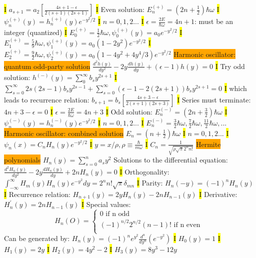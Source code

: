 \documentclass[fontsize=4pt]{scrartcl}
\begin{document}
\hl{I}
$a_{s+1} = a_2[\frac{4s+1-\epsilon}{2(s+1)(2s+1)}]$
\hl{I}
Even solution: $E_n^{(+)} = (2n+\frac{1}{2})\hbar \omega$
\hl{I}
$\psi_n^{(+)}(y) = h_{n}^{(+)}(y)e^{-y^2/2}$
\hl{I}
$n = 0,1,2 ...$
\hl{I}
$\epsilon =\frac{2E}{\hbar \omega}=4n+1$: must be an integer (quantized)
\hl{I}
$E_0^{(+)} = \frac{1}{2}\hbar \omega, \psi_0^{(+)}(y) = a_0 e^{-y^2 /2}$
\hl{I}
$E_1^{(+)} = \frac{5}{9}\hbar \omega, \psi_1^{(+)}(y) = a_0 (1-2y^2)e^{-y^2 /2}$
\hl{I}
$E_2^{(+)} = \frac{9}{2}\hbar \omega, \psi_2^{(+)}(y) = a_0(1-4y^2+4y^4/3) e^{-y^2 /2}$
\colorbox{Orange}{Harmonic oscillator: quantum odd-party solution}
$\frac{d^2 h(y)}{dy^2} -2y\frac{dh(y)}{dy} + (\epsilon - 1)h(y) = 0$
\hl{I}
Try odd solution: $h^{(-)}(y) = \sum_0^{\infty} b_s y^{2s+1}$
\hl{I}
$\sum_{s=0}^{\infty} 2s(2s - 1)b_s y^{2s-1} + \sum_{s=0}^{\infty} (\epsilon -1 -2(2s+1))b_s y^{2s+1} = 0$
\hl{I}
which  leads to recurrence relation: $b_{s+1} = b_s[\frac{4s+3-\epsilon}{2(s+1)(2s+3)}]$
\hl{I}
Series must terminate: $4n + 3 - \epsilon  = 0$
\hl{I}
$\epsilon = \frac{2E}{\hbar \omega} = 4n + 3$
\hl{I}
Odd solution: $E_{n}^{(-)} = (2n + \frac{3}{2}) \hbar \omega$
\hl{I}
$\psi_n^{(-)}(y) = h_n^{(-)}(y)e^{-y^2 / 2}$ 
\hl{I}
$n = 0,1,2 ...$
\hl{I}
$E_n^{(-)} = \frac{3}{2}\hbar \omega,  \frac{7}{2}\hbar \omega,  \frac{11}{2}\hbar \omega , ...$
\colorbox{Orange}{Harmonic oscillator: combined solution}
$E_n = (n+\frac{1}{2})\hbar \omega$
\hl{I}
$n= 0,1,2 ... $
\hl{I}
$\psi_n(x) = C_n H_n (y) e^{-y^2 / 2} $
\hl{I}
$y = x / \rho , \rho \equiv \frac{\hbar}{m\omega}$
\hl{I}
$C_n = \frac{1}{\sqrt{\rho \sqrt{\pi}2^n n!} }$
\colorbox{Orange}{Hermite polynomials}
$H_n (y) = \sum_{s=0}^{n} a_s y^2$
Solutions to the differential equation: $\frac{d^2 H_n (y)}{dy^2} - 2y \frac{dH_n (y)}{dy} + 2nH_n (y) = 0$
\hl{I}
Orthogonality: $ \int_{-\infty}^{\infty} H_m (y) H_n (y) e^{-y^2} dy = 2^{n} n! \sqrt{\pi} \delta_{mn}$
\hl{I}
Parity: $H_n(-y) = (-1)^n H_n(y)$
\hl{I}
Recurrence relation: $H_{n+1}( y)=2yH_n(y) - 2nH_{n-1}(y)$
\hl{I}
Derivative: $H_n^{\prime}(y) = 2nH_{n-1}(y)$
\hl{I}
Special values: 
\[
    H_n(O)=\left\{
                \begin{array}{ll}
                  0 \text{ if n odd} \\
                  (-1)^{n/2}2^{n/2} (n-1)! \text{ if n even }\\
                \end{array}
              \right.
\]
Can be generated by: $H_n (y) = (-1)^n e^{y^2} \frac{d^n}{dy^n}(e^{-y^2})$ 
\hl{I}
$H_0(y)=1$
\hl{I}
$H_1(y) = 2y$
\hl{I}
$H_2(y) = 4y^2 - 2$
\hl{I}
$H_3(y) = 8y^3 - 12y$
\end{document}
